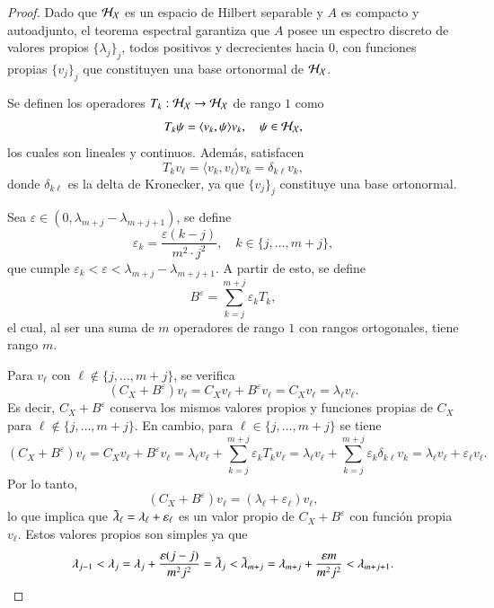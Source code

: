\begin{proof}
    Dado que $\mathcal{H}_{\mathcal{X}}$ es un espacio de Hilbert separable y $A$ es compacto y autoadjunto, el teorema espectral \cite{Brezis2011FunctionalEquations} garantiza que $A$ posee un espectro discreto de valores propios $\{ \lambda_j \}_j$, todos positivos y decrecientes hacia $0$, con funciones propias $\{ v_j \}_j$ que constituyen una base ortonormal de $\mathcal{H}_{\mathcal{X}}$.

    Se definen los operadores $T_k : \mathcal{H}_{\mathcal{X}} \to \mathcal{H}_{\mathcal{X}}$ de rango $1$ como
    \[
    T_k \psi = \langle v_k, \psi \rangle v_k, \quad \psi \in \mathcal{H}_{\mathcal{X}},
    \]
    los cuales son lineales y continuos. Además, satisfacen
    \[
    T_k v_\ell = \langle v_k, v_\ell \rangle v_k = \delta_{k \ell} v_k,
    \]
    donde $\delta_{k \ell}$ es la delta de Kronecker, ya que $\{ v_j \}_j$ constituye una base ortonormal.

    Sea $\varepsilon \in (0, \lambda_{m+j} - \lambda_{m+j+1})$, se define
    \[
    \varepsilon_k = \frac{\varepsilon (k-j)}{m^2 \cdot j^2}, \quad k \in \{ j, \dots , m+j \},
    \]
    que cumple $\varepsilon_k < \varepsilon < \lambda_{m+j} - \lambda_{m+j+1}$. A partir de esto, se define 
    \[
    B^\varepsilon = \sum_{k=j}^{m+j} \varepsilon_k T_k,
    \]
    el cual, al ser una suma de $m$ operadores de rango $1$ con rangos ortogonales, tiene rango $m$.

    Para \( v_\ell \) con $\ell \notin \{ j, \dots, m+j \}$, se verifica
    \[
    (C_X + B^\varepsilon) v_\ell = C_X v_\ell + B^\varepsilon v_\ell = C_X v_\ell = \lambda_\ell v_\ell.
    \]
    Es decir, $C_X + B^\varepsilon$ conserva los mismos valores propios y funciones propias de $C_X$ para $\ell \notin \{ j, \dots, m+j \}$. En cambio, para $\ell \in \{ j, \dots, m+j \}$ se tiene
    \[
    (C_X + B^\varepsilon) v_\ell = C_X v_\ell + B^\varepsilon v_\ell = \lambda_\ell v_\ell + \sum_{k=j}^{m+j} \varepsilon_k T_k v_\ell = \lambda_\ell v_\ell + \sum_{k=j}^{m+j} \varepsilon_k \delta_{k \ell} v_k = \lambda_\ell v_\ell + \varepsilon_\ell v_\ell.
    \]
    Por lo tanto,
    \[
    (C_X + B^\varepsilon)v_\ell = (\lambda_\ell + \varepsilon_\ell) v_\ell,
    \]
    lo que implica que $\Tilde{\lambda}_\ell = \lambda_\ell + \varepsilon_\ell$ es un valor propio de $C_X + B^\varepsilon$ con función propia $v_\ell$. Estos valores propios son simples ya que
    \[
    \lambda_{j-1} < \lambda_j = \lambda_j + \frac{\varepsilon (j-j)}{m^2 j^2} = \Tilde{\lambda}_j < \Tilde{\lambda}_{m+j} = \lambda_{m+j} + \frac{\varepsilon m}{m^2 j^2} < \lambda_{m+j+1}.
    \]


\end{proof}
